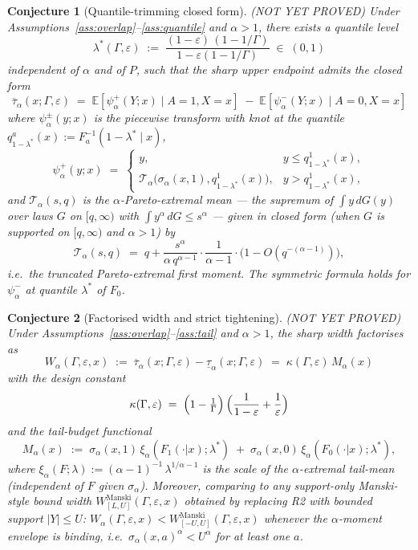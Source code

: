 \documentclass[11pt]{article}
\newcommand{\E}{\mathbb{E}}
\theoremstyle{definition}
\theoremstyle{plain}
\newtheorem{conjecture}{Conjecture}
\theoremstyle{remark}
\begin{document}
\begin{conjecture}[Quantile-trimming closed form] \emph{(NOT YET PROVED)} \label{conj:closedform}
Under Assumptions~\ref{ass:overlap}--\ref{ass:quantile} and $\alpha > 1$, there exists a quantile level
$$\lambda^*(\Gamma,\varepsilon) \;:=\; \frac{(1-\varepsilon)\,(1 - 1/\Gamma)}{1 - \varepsilon(1 - 1/\Gamma)} \;\in\; (0, 1)$$
independent of $\alpha$ and of $P$, such that the sharp upper endpoint admits the closed form
$$\overline{\tau}_\alpha(x;\Gamma,\varepsilon) \;=\; \E[\psi^+_\alpha(Y; x) \mid A=1, X=x] \;-\; \E[\psi^-_\alpha(Y; x) \mid A=0, X=x]$$
where $\psi^\pm_\alpha(y;x)$ is the piecewise transform with knot at the quantile $q^a_{1-\lambda^*}(x) := F_a^{-1}(1-\lambda^* \mid x)$,
$$\psi^+_\alpha(y;x) \;=\; \begin{cases} y, & y \le q^1_{1-\lambda^*}(x), \\ \mathcal{T}_\alpha\bigl(\sigma_\alpha(x,1), q^1_{1-\lambda^*}(x)\bigr), & y > q^1_{1-\lambda^*}(x), \end{cases}$$
and $\mathcal{T}_\alpha(s, q)$ is the $\alpha$-Pareto-extremal mean — the supremum of $\int y\,dG(y)$ over laws $G$ on $[q,\infty)$ with $\int y^\alpha\,dG \le s^\alpha$ — given in closed form (when $G$ is supported on $[q,\infty)$ and $\alpha > 1$) by
$$\mathcal{T}_\alpha(s,q) \;=\; q + \frac{s^\alpha}{\alpha\,q^{\alpha-1}}\cdot\frac{1}{\alpha - 1}\cdot \bigl(1 - O(q^{-(\alpha-1)})\bigr),$$
i.e.\ the truncated Pareto-extremal first moment. The symmetric formula holds for $\psi^-_\alpha$ at quantile $\lambda^*$ of $F_0$.
\end{conjecture}

\begin{conjecture}[Factorised width and strict tightening] \emph{(NOT YET PROVED)} \label{conj:width}
Under Assumptions~\ref{ass:overlap}--\ref{ass:tail} and $\alpha > 1$, the sharp width factorises as
$$W_\alpha(\Gamma,\varepsilon,x) \;:=\; \overline{\tau}_\alpha(x;\Gamma,\varepsilon) - \underline{\tau}_\alpha(x;\Gamma,\varepsilon) \;=\; \kappa(\Gamma,\varepsilon)\,M_\alpha(x)$$
with the \emph{design constant}
$$\kappa(\Gamma,\varepsilon) \;=\; \Bigl(1 - \tfrac{1}{\Gamma}\Bigr)\,\Bigl(\frac{1}{1-\varepsilon} + \frac{1}{\varepsilon}\Bigr)$$
and the \emph{tail-budget functional}
$$M_\alpha(x) \;:=\; \sigma_\alpha(x,1)\,\xi_\alpha(F_1(\cdot|x);\lambda^*) \;+\; \sigma_\alpha(x,0)\,\xi_\alpha(F_0(\cdot|x);\lambda^*),$$
where $\xi_\alpha(F;\lambda) := (\alpha - 1)^{-1}\,\lambda^{1/\alpha - 1}$ is the scale of the $\alpha$-extremal tail-mean (independent of $F$ given $\sigma_\alpha$). Moreover, comparing to any support-only Manski-style bound width $W^{\mathrm{Manski}}_{[L,U]}(\Gamma,\varepsilon,x)$ obtained by replacing R2 with bounded support $|Y| \le U$:
$W_\alpha(\Gamma,\varepsilon,x) < W^{\mathrm{Manski}}_{[-U,U]}(\Gamma,\varepsilon,x)$ whenever the $\alpha$-moment envelope is binding, i.e.\ $\sigma_\alpha(x,a)^\alpha < U^\alpha$ for at least one $a$.
\end{conjecture}
\end{document}
